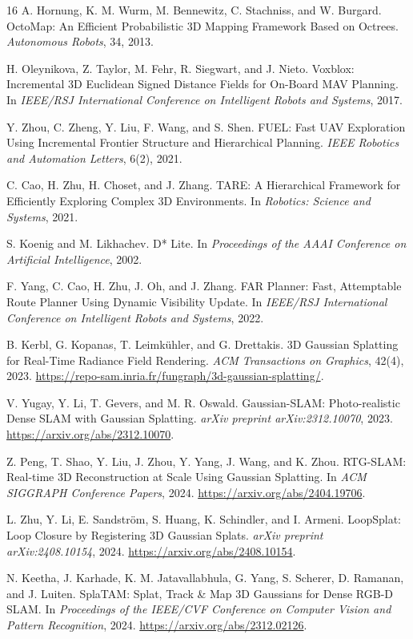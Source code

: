 \documentclass[10pt,a4paper]{article}
\begin{document}
\begin{thebibliography}{16}
A. Hornung, K. M. Wurm, M. Bennewitz, C. Stachniss, and W. Burgard. OctoMap: An Efficient Probabilistic 3D Mapping Framework Based on Octrees.
\emph{Autonomous Robots}, 34, 2013.

H. Oleynikova, Z. Taylor, M. Fehr, R. Siegwart, and J. Nieto. Voxblox: Incremental 3D Euclidean Signed Distance Fields for On-Board MAV Planning.
In \emph{IEEE/RSJ International Conference on Intelligent Robots and Systems}, 2017.

Y. Zhou, C. Zheng, Y. Liu, F. Wang, and S. Shen. FUEL: Fast UAV Exploration Using Incremental Frontier Structure and Hierarchical Planning.
\emph{IEEE Robotics and Automation Letters}, 6(2), 2021.

C. Cao, H. Zhu, H. Choset, and J. Zhang. TARE: A Hierarchical Framework for Efficiently Exploring Complex 3D Environments.
In \emph{Robotics: Science and Systems}, 2021.

S. Koenig and M. Likhachev. D* Lite.
In \emph{Proceedings of the AAAI Conference on Artificial Intelligence}, 2002.

F. Yang, C. Cao, H. Zhu, J. Oh, and J. Zhang. FAR Planner: Fast, Attemptable Route Planner Using Dynamic Visibility Update.
In \emph{IEEE/RSJ International Conference on Intelligent Robots and Systems}, 2022.

B. Kerbl, G. Kopanas, T. Leimk\"uhler, and G. Drettakis. 3D Gaussian Splatting for Real-Time Radiance Field Rendering.
\emph{ACM Transactions on Graphics}, 42(4), 2023. \url{https://repo-sam.inria.fr/fungraph/3d-gaussian-splatting/}.

V. Yugay, Y. Li, T. Gevers, and M. R. Oswald. Gaussian-SLAM: Photo-realistic Dense SLAM with Gaussian Splatting.
\emph{arXiv preprint arXiv:2312.10070}, 2023. \url{https://arxiv.org/abs/2312.10070}.

Z. Peng, T. Shao, Y. Liu, J. Zhou, Y. Yang, J. Wang, and K. Zhou. RTG-SLAM: Real-time 3D Reconstruction at Scale Using Gaussian Splatting.
In \emph{ACM SIGGRAPH Conference Papers}, 2024. \url{https://arxiv.org/abs/2404.19706}.

L. Zhu, Y. Li, E. Sandstr\"om, S. Huang, K. Schindler, and I. Armeni. LoopSplat: Loop Closure by Registering 3D Gaussian Splats.
\emph{arXiv preprint arXiv:2408.10154}, 2024. \url{https://arxiv.org/abs/2408.10154}.

N. Keetha, J. Karhade, K. M. Jatavallabhula, G. Yang, S. Scherer, D. Ramanan, and J. Luiten. SplaTAM: Splat, Track \& Map 3D Gaussians for Dense RGB-D SLAM.
In \emph{Proceedings of the IEEE/CVF Conference on Computer Vision and Pattern Recognition}, 2024. \url{https://arxiv.org/abs/2312.02126}.


\end{thebibliography}
\end{document}
